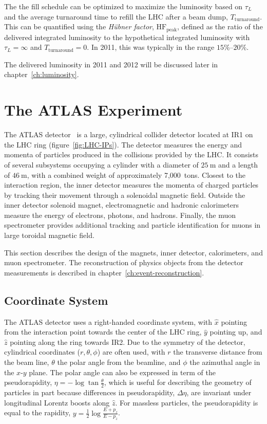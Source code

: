 \begin{itemize}
	The the fill schedule can be optimized to maximize the luminosity based on $\tau_L$ and the average turnaround time to refill the LHC after a beam dump, $T_{\mathrm{turnaround}}$. This can be quantified using the \emph{H{\"u}bner factor}, $\mathrm{HF}_{\mathrm{peak}}$, defined as the ratio of the delivered integrated luminosity to the hypothetical integrated luminosity with $\tau_L=\infty$ and $T_{\mathrm{turnaround}}=0$. In 2011, this was typically in the range $15\%$--$20\%$.
\end{itemize}

The delivered luminosity in 2011 and 2012 will be discussed later in chapter~\ref{ch:luminosity}.


\section{The ATLAS Experiment}\label{sec:the-atlas-experiment}

The ATLAS detector~\cite{TheATLASCollaboration:2008fg} is a large, cylindrical collider detector located at IR1 on the LHC ring (figure~\ref{fig:LHC-IPs}). The detector measures the energy and momenta of particles produced in the collisions provided by the LHC. It consists of several subsystems occupying a cylinder with a diameter of $\SI{25}{\meter}$ and a length of $\SI{46}{\meter}$, with a combined weight of approximately 7,000~tons. Closest to the interaction region, the inner detector measures the momenta of charged particles by tracking their movement through a solenoidal magnetic field. Outside the inner detector solenoid magnet, electromagnetic and hadronic calorimeters measure the energy of electrons, photons, and hadrons. Finally, the muon spectrometer provides additional tracking and particle identification for muons in large toroidal magnetic field. 

This section describes the design of the magnets, inner detector, calorimeters, and muon spectrometer. The reconstruction of physics objects from the detector measurements is described in chapter~\ref{ch:event-reconstruction}. 

\subsection{Coordinate System}\label{sec:ATLAS-coordinate-system}

The ATLAS detector uses a right-handed coordinate system, with $\hat{x}$ pointing from the interaction point towards the center of the LHC ring, $\hat{y}$ pointing up, and $\hat{z}$ pointing along the ring towards IR2. Due to the symmetry of the detector, cylindrical coordinates ($r,\theta,\phi$) are often used, with $r$ the transverse distance from the beam line, $\theta$ the polar angle from the beamline, and $\phi$ the azimuthal angle in the $x$-$y$ plane. The polar angle can also be expressed in term of the pseudorapidity, $\eta = -\log \tan \frac{\theta}{2}$, which is useful for describing the geometry of particles in part because differences in pseudorapidity, $\Delta\eta$, are invariant under longitudinal Lorentz boosts along $\hat{z}$. For massless particles, the pseudorapidity is equal to the rapidity, $y=\frac12 \log \frac{E+p_z}{E-p_z}$. 

